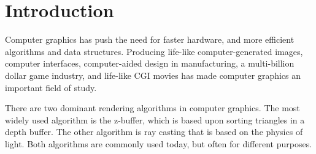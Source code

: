 \section{ Introduction }

Computer graphics has push the need for faster hardware,  and more efficient algorithms and data structures.  Producing life-like computer-generated images,  computer interfaces, computer-aided design in manufacturing, a multi-billion dollar game industry, and life-like CGI movies\cite{gaming:2007} has made computer graphics an important field of study.

There are two dominant rendering algorithms in computer graphics.  The most widely used algorithm is the z-buffer, which is based upon sorting triangles in a depth buffer.  The other algorithm is ray casting that is based on the physics of light.  Both algorithms are commonly used today, but often for different purposes.  


